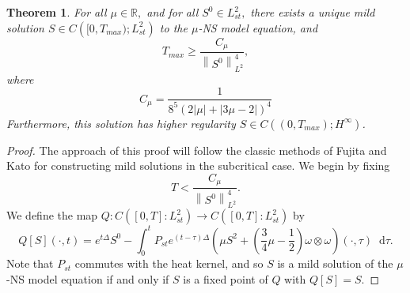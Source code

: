 \documentclass[11pt]{article}
\theoremstyle{plain}
\newtheorem{theorem}{Theorem}[section]
\theoremstyle{remark}
\numberwithin{equation}{section}
\newcommand{\diff}{\mathop{}\!\mathrm{d}}
\begin{document}
\begin{theorem} \label{MildExistence}
For all $\mu\in\mathbb{R},$ and for all $S^0\in L^2_{st},$
there exists a unique mild solution
$S\in C\left([0,T_{max});L^2_{st}\right)$ to the $\mu$-NS model equation, and
\begin{equation}
    T_{max}\geq \frac{C_\mu}{\left \|S^0\right\|_{L^2}^4},
\end{equation}
where 
\begin{equation}
    C_\mu
    =
    \frac{1}{8^5\left(2|\mu|
    +\left|3\mu-2\right|\right)^4}
\end{equation}
Furthermore, this solution has higher regularity
$S\in C\left((0,T_{max});H^\infty \right)$.
\end{theorem}




\begin{proof}
    The approach of this proof will follow the classic methods of Fujita and Kato \cite{KatoFujita} for constructing mild solutions in the subcritical case.
    We begin by fixing 
\begin{equation}
    T<\frac{C_\mu}
    {\left\|S^0\right\|_{L^2}^4}.
\end{equation}
We define the map $Q: C\left([0,T]:L^2_{st}\right)
\to C\left([0,T]:L^2_{st}\right)$
by
\begin{equation}
Q[S](\cdot,t)= e^{t\Delta} S^0
-\int_0^t P_{st} e^{(t-\tau)\Delta}
\left(\mu S^2+ 
\left(\frac{3}{4}\mu-\frac{1}{2}\right)
\omega\otimes\omega \right)(\cdot,\tau)
\diff\tau.
\end{equation}
Note that $P_{st}$ commutes with the heat kernel, and so $S$ is a mild solution of the $\mu$-NS model equation if and only if $S$ is a fixed point of $Q$ with $Q[S]=S$.


\end{proof}
\end{document}
